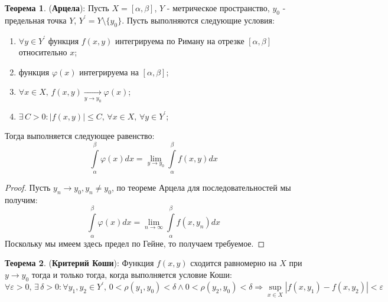 \documentclass[12pt]{article}
\newcommand{\VE}{\varepsilon}
\theoremstyle{definition}
\newtheorem{theorem}{Теорема}
\newcommand{\ddint}[2]{\displaystyle\int\limits_{#1}^{#2}}
\begin{document}
\begin{theorem}(\textbf{Арцела}):
	Пусть $X = [\alpha, \beta]$, $Y$ - метрическое пространство, $y_0$ - предельная точка $Y$, $Y^\prime = Y \setminus \{y_0\}$. Пусть выполняются следующие условия:
	\begin{enumerate}[label=(\arabic*)]
		\item  $\forall y \in Y^\prime$ функция $f(x,y)$ интегрируема по Риману на отрезке $[\alpha,\beta]$ относительно $x$;
		\item функция $\varphi(x)$ интегрируема на $[\alpha, \beta]$;
		\item $\forall x \in X,\, f(x,y) \xrightarrow[y \to y_0]{} \varphi(x)$;
		\item $\exists \, C > 0 \colon |f(x,y)| \leq C, \, \forall x \in X, \, \forall y \in Y^\prime$;
	\end{enumerate}
	Тогда выполняется следующее равенство:
	$$
		\ddint{\alpha}{\beta}\varphi(x) dx = \lim\limits_{y \to y_0}\ddint{\alpha}{\beta}f(x,y)dx
	$$
\end{theorem}
\begin{proof}
	Пусть $y_n \to y_0, y_n \neq y_0$, по теореме Арцела для последовательностей мы получим:
	$$
			\ddint{\alpha}{\beta}\varphi(x) dx = \lim\limits_{n \to \infty}\ddint{\alpha}{\beta}f(x,y_n)dx
	$$
	Поскольку мы имеем здесь предел по Гейне, то получаем требуемое.
\end{proof}
\begin{theorem}(\textbf{Критерий Коши}): Функция $f(x,y)$ сходится равномерно на $X$ при $y \to y_0$ тогда и только тогда, когда выполняется условие Коши:
$$
	\forall \VE > 0, \, \exists \, \delta > 0 \colon \forall y_1, y_2 \in Y^\prime, \, 0 < \rho(y_1, y_0) < \delta \wedge 0 < \rho(y_2, y_0) < \delta \Rightarrow \sup\limits_{x \in X}\left|f(x,y_1) - f(x,y_2)\right| <\VE
$$
\end{theorem}
\end{document}
